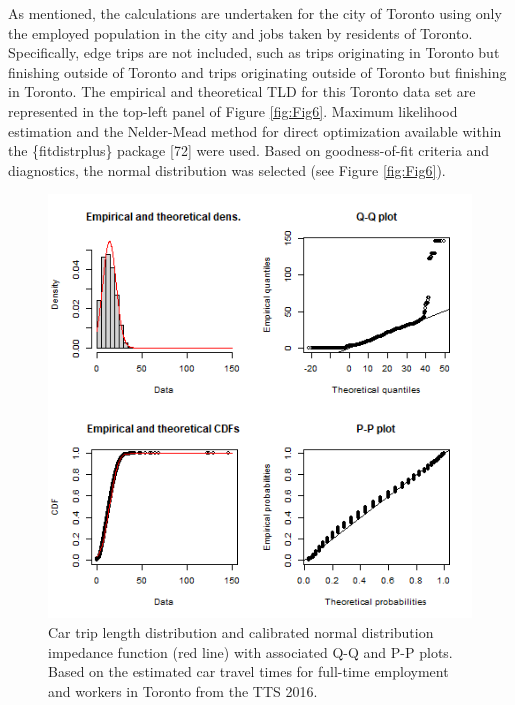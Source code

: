 \documentclass[10pt,letterpaper]{article}
\begin{document}
As mentioned, the calculations are undertaken for the city of Toronto
using only the employed population in the city and jobs taken by
residents of Toronto. Specifically, edge trips are not included, such as
trips originating in Toronto but finishing outside of Toronto and trips
originating outside of Toronto but finishing in Toronto. The empirical
and theoretical TLD for this Toronto data set are represented in the
top-left panel of Figure \ref{fig:Fig6}. Maximum likelihood estimation
and the Nelder-Mead method for direct optimization available within the
\{fitdistrplus\} package {[}72{]} were used. Based on goodness-of-fit
criteria and diagnostics, the normal distribution was selected (see
Figure \ref{fig:Fig6}).

\begin{figure}

{\centering \includegraphics[width=1\linewidth]{images/Fig6} 

}

\caption{\label{fig:Fig6}Car trip length distribution and calibrated normal distribution impedance function (red line) with associated Q-Q and P-P plots. Based on the estimated car travel times for full-time employment and workers in Toronto from the TTS 2016.}\label{fig:TLD-norm-plot}
\end{figure}
\end{document}
